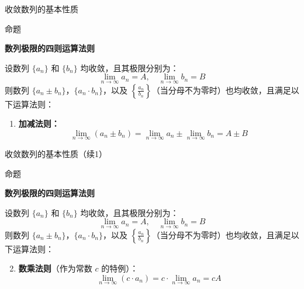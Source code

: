 \documentclass[aspectratio=169,10pt,fontset=fandol]{ctexbeamer}
\begin{document}
\begin{frame}[t,fragile]{收敛数列的基本性质}
\footnotesize
\begin{block}{命题}
{\footnotesize
\textbf{数列极限的四则运算法则}\par



设数列 $\{a_n\}$ 和 $\{b_n\}$ 均收敛，且其极限分别为：
\begin{equation*}
	\lim\limits_{n \to \infty} a_n = A, \quad \lim\limits_{n \to \infty} b_n = B
\end{equation*}
则数列 $\{a_n \pm b_n\}$，$\{a_n \cdot b_n\}$，以及 $\left\{\frac{a_n}{b_n}\right\}$（当分母不为零时）也均收敛，且满足以下运算法则：

\begin{enumerate}
	\item \textbf{加减法则：}
	\begin{equation*}
		\lim\limits_{n \to \infty} (a_n \pm b_n) = \lim\limits_{n \to \infty} a_n \pm \lim\limits_{n \to \infty} b_n = A \pm B
	\end{equation*}
	
	
\end{enumerate}
}
\end{block}
\end{frame}
\begin{frame}[t,fragile]{收敛数列的基本性质（续1）}
\footnotesize
\begin{block}{命题}
{\footnotesize
\textbf{数列极限的四则运算法则}\par



设数列 $\{a_n\}$ 和 $\{b_n\}$ 均收敛，且其极限分别为：
\begin{equation*}
	\lim\limits_{n \to \infty} a_n = A, \quad \lim\limits_{n \to \infty} b_n = B
\end{equation*}
则数列 $\{a_n \pm b_n\}$，$\{a_n \cdot b_n\}$，以及 $\left\{\frac{a_n}{b_n}\right\}$（当分母不为零时）也均收敛，且满足以下运算法则：

\begin{enumerate}
	\setcounter{enumi}{1}
\item \textbf{数乘法则}（作为常数 $c$ 的特例）：
	\begin{equation*}
		\lim\limits_{n \to \infty} (c \cdot a_n) = c \cdot \lim\limits_{n \to \infty} a_n = cA
	\end{equation*}
	
	
\end{enumerate}
}
\end{block}
\end{frame}
\end{document}
